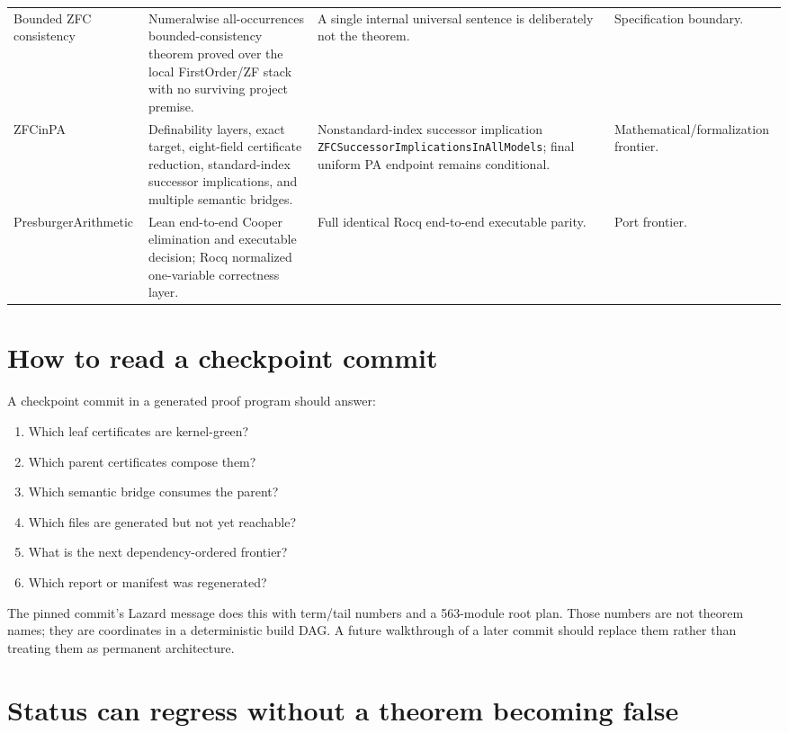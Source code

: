 \documentclass[
  10pt,
  a4paper,
  twoside,
  open=any,
  parskip=half,
  headings=big
]{scrreprt}
\newcommand{\bcode}[1]{{\ttfamily\footnotesize\nolinkurl{#1}}}
\begin{document}
\begin{landscape}
\begin{longtable}{L{.20\linewidth}L{.28\linewidth}L{.28\linewidth}L{.16\linewidth}}
Bounded ZFC consistency &
Numeralwise all-occurrences bounded-consistency theorem proved over the local
FirstOrder/ZF stack with no surviving project premise. &
A single internal universal sentence is deliberately not the theorem. &
Specification boundary.\\

ZFCinPA &
Definability layers, exact target, eight-field certificate reduction,
standard-index successor implications, and multiple semantic bridges. &
Nonstandard-index successor implication
\bcode{ZFCSuccessorImplicationsInAllModels}; final uniform PA endpoint remains
conditional. &
Mathematical/formalization frontier.\\

PresburgerArithmetic &
Lean end-to-end Cooper elimination and executable decision; Rocq normalized
one-variable correctness layer. &
Full identical Rocq end-to-end executable parity. &
Port frontier.\\
\bottomrule
\end{longtable}
\end{landscape}

\section{How to read a checkpoint commit}

A checkpoint commit in a generated proof program should answer:

\begin{enumerate}
  \item Which leaf certificates are kernel-green?
  \item Which parent certificates compose them?
  \item Which semantic bridge consumes the parent?
  \item Which files are generated but not yet reachable?
  \item What is the next dependency-ordered frontier?
  \item Which report or manifest was regenerated?
\end{enumerate}

The pinned commit's Lazard message does this with term/tail numbers and a
563-module root plan.  Those numbers are not theorem names; they are
coordinates in a deterministic build DAG.  A future walkthrough of a later
commit should replace them rather than treating them as permanent
architecture.

\section{Status can regress without a theorem becoming false}
\end{document}
